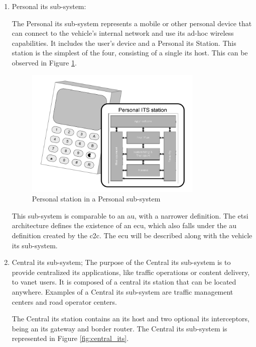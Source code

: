 \begin{enumerate}
	\item Personal \gls{its} sub-system:

The Personal \gls{its} sub-system represents a mobile or other personal device that can connect to the vehicle's internal network and use its ad-hoc wireless capabilities. It includes the user's device and a Personal \gls{its} Station. This station is the simplest of the four, consisting of a single \gls{its} host. This can be observed in Figure \ref{fig:personal_its}.

\begin{figure}[htbp]
    \centering
   	\includegraphics[width=0.8\textwidth]{Chapters/Figures/VANETs/personal_ITS.png}
   	\caption{Personal  station in a Personal  sub-system~\cite{etsi_intelligent_2010}}
   	\label{fig:personal_its}
\end{figure}


This sub-system is comparable to an \gls{au}, with a narrower definition. The \gls{etsi} architecture defines the existence of an \gls{ecu}, which also falls under the \gls{au} definition created by the \gls{c2c}. The \gls{ecu} will be described along with the vehicle \gls{its} sub-system.
	\item Central \gls{its} sub-system;
The purpose of the Central \gls{its} sub-system is to provide centralized \gls{its} applications, like traffic operations or content delivery, to \gls{vanet} users. It is composed of a central \gls{its} station that can be located anywhere. Examples of a Central \gls{its} sub-system are traffic management centers and road operator centers.

The Central \gls{its} station contains an \gls{its} host and two optional \gls{its} interceptors, being an \gls{its} gateway and border router. The Central \gls{its} sub-system is represented in Figure \ref{fig:central_its}.


\end{enumerate}
